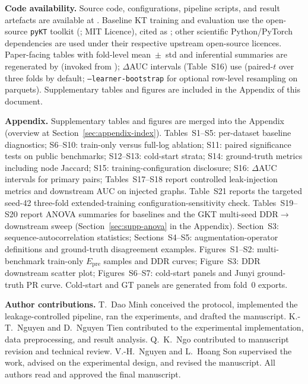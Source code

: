 \documentclass[pdflatex,sn-mathphys-num]{sn-jnl}
\newcommand{\Epre}{\ensuremath{E_{\text{pre}}}}
\newcommand{\DDR}{\textsc{DDR}}
\begin{document}
\medskip\noindent\textbf{Code availability.} Source code, configurations, pipeline
scripts, and result artefacts are available at
. Baseline KT training and
evaluation use the open-source \texttt{pyKT} toolkit
(; MIT Licence), cited as
\cite{liu2022pykt}; other scientific Python/PyTorch dependencies are used under
their respective upstream open-source licences. Paper-facing tables with
fold-level mean~$\pm$~std and inferential summaries are regenerated by
 (invoked from
); $\Delta$AUC intervals (Table~S16)
use  (paired-$t$ over three folds by default;
\texttt{--learner-bootstrap} for optional row-level resampling on parquets).
Supplementary tables and figures are included in the Appendix of this document.

\medskip\noindent\textbf{Appendix.} Supplementary tables and figures are merged into
the Appendix (overview at Section~\ref{sec:appendix-index}).
Tables~S1--S5: per-dataset baseline diagnostics; S6--S10: train-only versus
full-log ablation; S11: paired significance tests on public benchmarks;
S12--S13: cold-start strata; S14: ground-truth metrics including node Jaccard;
S15: training-configuration disclosure; S16: $\Delta$AUC intervals for primary pairs;
Tables~S17--S18 report controlled leak-injection metrics and downstream AUC
on injected graphs. Table~S21 reports the targeted seed-42 three-fold
extended-training configuration-sensitivity check.
Tables~S19--S20 report ANOVA summaries
for baselines and the GKT multi-seed \DDR{}$\to$downstream sweep
(Section~\ref{sec:supp-anova} in the Appendix).
Section~S3: sequence-autocorrelation statistics; Sections~S4--S5:
augmentation-operator definitions and ground-truth disagreement examples.
Figures~S1--S2: multi-benchmark train-only $\Epre$ samples and \DDR{} curves;
Figure~S3: \DDR{} downstream scatter plot;
Figures~S6--S7: cold-start panels and Junyi ground-truth PR curve.
Cold-start and GT panels are generated from fold~0 exports.

\medskip\noindent\textbf{Author contributions.}
T.~Dao Minh conceived the protocol, implemented the leakage-controlled pipeline,
ran the experiments, and drafted the manuscript. K.-T.~Nguyen and
D.~Nguyen Tien contributed to the experimental implementation, data
preprocessing, and result analysis. Q.~K.~Ngo contributed to manuscript
revision and technical review. V.-H.~Nguyen and L.~Hoang Son supervised the
work, advised on the experimental design, and revised the manuscript. All
authors read and approved the final manuscript.


\end{document}
